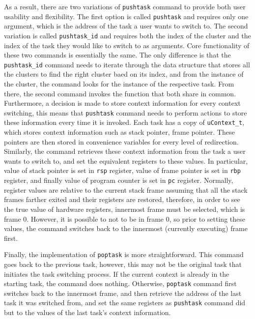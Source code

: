 As a result, there are two variations of \verb|pushtask| command to provide both
user usability and flexibility. The first option is called \verb|pushtask| and requires
only one argument, which is the address of the task a user wants to switch to.
The second variation is called \verb|pushtask_id| and requires both the index of
the cluster and the index of the task they would like
to switch to as arguments. Core functionality of these two commands is
essentially the same. The only difference is that the \verb|pushtask_id| command
needs to iterate through the data structure that stores all the clusters to find
the right cluster baed on its index, and from the instance of the cluster, the
command looks for the instance of the respective task. From there, the second
command invokes the function that both share in common. Furthermore, a decision
is made to store context information for every context switching, this means
that \verb|pushtask| command needs to perform actions to store these information every time it is
invoked. Each task has a copy of \verb|uContext_t|, which stores context
information such as stack pointer, frame pointer. These pointers are then stored
in convenience variables for every level of redirection. Similarly, the command
retrieves these context information from the task a user wants to switch to, and
set the equivalent registers to these values. In particular, value of stack
pointer is set in \verb|rsp| register, value of frame pointer is set in \verb|rbp|
register, and finally value of program counter is set in \verb|pc| register.
Normally, register values are relative to the current stack frame assuming that
all the stack frames farther exited and their registers are restored, therefore, in
order to see the true value of hardware registers, innermost frame must be
selected, which is frame 0\cite{reference}. However, it is possible to not to be in frame 0, so prior to setting these values,
the command switches back to the innermost (currently executing) frame first.

Finally, the implementation of \verb|poptask| is more straightforward. This
command goes back to the previous task, however, this may not be the original
task that initiates the task switching process. If the current context is
already in the starting task, the command does nothing. Otherwise, \verb|poptask| command first switches back to the innermost frame, and then retrieve the
address of the last task it was switched from, and set the same registers as
\verb|pushtask| command did but to the values of the last task's context
information.
